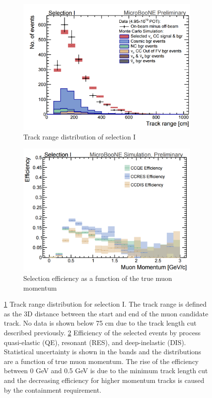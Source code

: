 \begin{figure}[htp!]
\centering
	\begin{subfigure}[b]{.4\textwidth}
	\includegraphics[width=\textwidth]{figs/track_distribution.png}
	\caption{Track range distribution of selection I}
	\label{fig:track}
	\end{subfigure}
	\quad	
	\begin{subfigure}[b]{.4\textwidth}
	\includegraphics[width=\textwidth]{figs/efficiencyvsmom.png}
	\caption{Selection efficiency as a function of the true muon momentum}
	\label{fig:eff}
	\end{subfigure}
	\quad
\label{fig:distributions}
\caption{\ref{fig:track} Track range distribution for selection I. The track range is defined as the 3D distance between the start and end of the muon candidate track. No data is shown below 75 cm due to the track length cut described previously. \ref{fig:eff} Efficiency of the selected events by process quasi-elastic (QE), resonant (RES), and deep-inelastic (DIS). Statistical uncertainty is shown in the bands and the distributions are a function of true muon momentum. The rise of the efficiency between 0 GeV and 0.5 GeV is due to the minimum track length cut and the decreasing efficiency for higher momentum tracks is caused by the containment requirement.} 
\end{figure}
